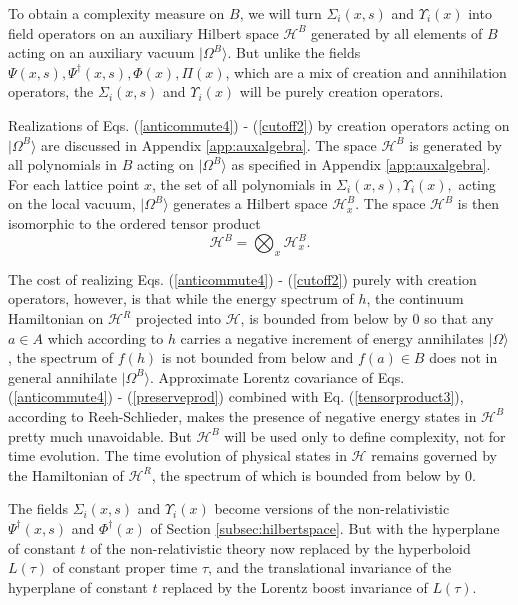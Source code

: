 \documentclass[twocolumn,amsmath,amssymb]{revtex4-1}
\begin{document}
To obtain a complexity measure on $B$, we will turn $\Sigma_i( x, s)$ and  $\Upsilon_i( x)$
into field operators on an auxiliary Hilbert space $\mathcal{H}^B$ 
generated by all elements of $B$ acting
on an auxiliary vacuum $|\Omega^B \rangle $.
But unlike the fields $\Psi(x, s), \Psi^\dagger(x,s), \Phi( x), \Pi(x)$,
which are a mix of creation and annihilation operators,
the $\Sigma_i( x, s)$ and  $\Upsilon_i( x)$ will be
purely creation operators. 

Realizations of Eqs. (\ref{anticommute4}) - (\ref{cutoff2}) by
creation operators acting on $|\Omega^B \rangle $ are discussed in
Appendix \ref{app:auxalgebra}.  The space $\mathcal{H}^B$
is generated by all polynomials in 
$B$ acting on $|\Omega^B \rangle $ as specified in Appendix \ref{app:auxalgebra}.
For each lattice point $x$, the set of all polynomials in 
$\Sigma_i( x, s), \Upsilon_i( x),$
acting on the local vacuum, $|\Omega^B \rangle $ generates a Hilbert space $\mathcal{H}^B_x$.
The space $\mathcal{H}^B$
is then isomorphic to the ordered tensor product
\begin{equation}
\label{tensorproduct3}
\mathcal{H}^B = \bigotimes_x \mathcal{H}^B_x.
\end{equation}

The cost of realizing Eqs. (\ref{anticommute4}) - (\ref{cutoff2})
purely with creation operators, however, is that
while the energy spectrum of $h$, the continuum Hamiltonian on $\mathcal{H}^R$
projected into $\mathcal{H}$,
is bounded from below by 0 so that any $a \in A$
which according to $h$ carries a negative increment of energy annihilates
$|\Omega \rangle $, the spectrum of $f(h)$ is not bounded from below
and $f(a) \in B$ does not in general
annihilate $|\Omega^B \rangle $.
Approximate Lorentz covariance of Eqs. (\ref{anticommute4}) - (\ref{preserveprod})
combined with Eq. (\ref{tensorproduct3}), according to Reeh-Schlieder,
makes the presence of negative energy states in $\mathcal{H}^B$
pretty much unavoidable. 
But $\mathcal{H}^B$ will
be used only to define complexity, not for time evolution.
The time evolution of
physical states in $\mathcal{H}$ remains governed by the Hamiltonian of $\mathcal{H}^R$, the
spectrum of which is bounded from below by 0.


The fields $\Sigma_i( x, s)$ and $\Upsilon_i( x)$
become versions of the non-relativistic 
$\Psi^\dagger( x, s)$ and $\Phi^\dagger( x)$ of Section \ref{subsec:hilbertspace}.
But with the hyperplane of constant $t$ of the non-relativistic theory now
replaced by the hyperboloid $L(\tau)$ of constant proper time $\tau$, and the
translational invariance of the hyperplane of constant $t$
replaced by the Lorentz boost invariance of $L(\tau)$.
\end{document}
